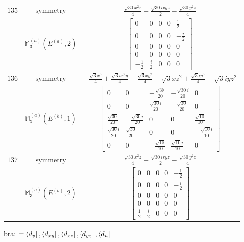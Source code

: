 \documentclass[fleqn,8pt,landscape]{jsarticle}
\begin{document}
\begin{longtable}{ccc}
$ 135 $ & $ \text{symmetry} $ & $ \frac{\sqrt{30} x^{2} z}{4} - \frac{\sqrt{30} i x y z}{2} - \frac{\sqrt{30} y^{2} z}{4} $ \\
$  $ & $ \mathbb{M}_{3}^{(a)}(E^{(a)},2) $ & $ \begin{bmatrix} 0 & 0 & 0 & 0 & \frac{1}{2} \\ 0 & 0 & 0 & 0 & - \frac{i}{2} \\ 0 & 0 & 0 & 0 & 0 \\ 0 & 0 & 0 & 0 & 0 \\ - \frac{1}{2} & \frac{i}{2} & 0 & 0 & 0 \end{bmatrix} $ \\ \hline
$ 136 $ & $ \text{symmetry} $ & $ - \frac{\sqrt{3} x^{3}}{4} + \frac{\sqrt{3} i x^{2} y}{4} - \frac{\sqrt{3} x y^{2}}{4} + \sqrt{3} x z^{2} + \frac{\sqrt{3} i y^{3}}{4} - \sqrt{3} i y z^{2} $ \\
$  $ & $ \mathbb{M}_{3}^{(a)}(E^{(b)},1) $ & $ \begin{bmatrix} 0 & 0 & - \frac{\sqrt{30}}{20} & - \frac{\sqrt{30} i}{20} & 0 \\ 0 & 0 & \frac{\sqrt{30} i}{20} & - \frac{\sqrt{30}}{20} & 0 \\ \frac{\sqrt{30}}{20} & - \frac{\sqrt{30} i}{20} & 0 & 0 & \frac{\sqrt{10}}{10} \\ \frac{\sqrt{30} i}{20} & \frac{\sqrt{30}}{20} & 0 & 0 & - \frac{\sqrt{10} i}{10} \\ 0 & 0 & - \frac{\sqrt{10}}{10} & \frac{\sqrt{10} i}{10} & 0 \end{bmatrix} $ \\ \hline
$ 137 $ & $ \text{symmetry} $ & $ \frac{\sqrt{30} x^{2} z}{4} + \frac{\sqrt{30} i x y z}{2} - \frac{\sqrt{30} y^{2} z}{4} $ \\
$  $ & $ \mathbb{M}_{3}^{(a)}(E^{(b)},2) $ & $ \begin{bmatrix} 0 & 0 & 0 & 0 & - \frac{1}{2} \\ 0 & 0 & 0 & 0 & - \frac{i}{2} \\ 0 & 0 & 0 & 0 & 0 \\ 0 & 0 & 0 & 0 & 0 \\ \frac{1}{2} & \frac{i}{2} & 0 & 0 & 0 \end{bmatrix} $ \\ \hline
\end{longtable}
bra: $=\bra{d_{v}}, \bra{d_{xy}}, \bra{d_{xz}}, \bra{d_{yz}}, \bra{d_{u}}$
\end{document}
